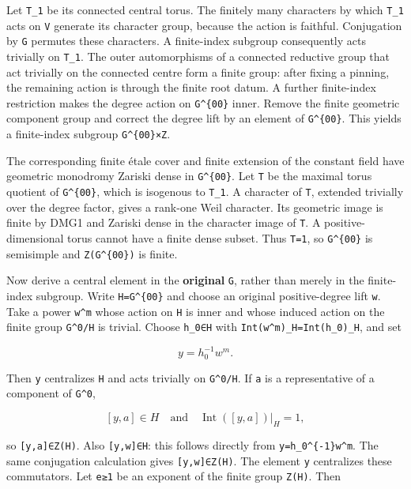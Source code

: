 \documentclass[
]{report}
\begin{document}
Let \texttt{T\_1} be its connected central torus. The finitely many
characters by which \texttt{T\_1} acts on \texttt{V} generate its
character group, because the action is faithful. Conjugation by
\texttt{G} permutes these characters. A finite-index subgroup
consequently acts trivially on \texttt{T\_1}. The outer automorphisms of
a connected reductive group that act trivially on the connected centre
form a finite group: after fixing a pinning, the remaining action is
through the finite root datum. A further finite-index restriction makes
the degree action on \texttt{G\^{}\{00\}} inner. Remove the finite
geometric component group and correct the degree lift by an element of
\texttt{G\^{}\{00\}}. This yields a finite-index subgroup
\texttt{G\^{}\{00\}×Z}.

The corresponding finite étale cover and finite extension of the
constant field have geometric monodromy Zariski dense in
\texttt{G\^{}\{00\}}. Let \texttt{T} be the maximal torus quotient of
\texttt{G\^{}\{00\}}, which is isogenous to \texttt{T\_1}. A character
of \texttt{T}, extended trivially over the degree factor, gives a
rank-one Weil character. Its geometric image is finite by DMG1 and
Zariski dense in the character image of \texttt{T}. A
positive-dimensional torus cannot have a finite dense subset. Thus
\texttt{T=1}, so \texttt{G\^{}\{00\}} is semisimple and
\texttt{Z(G\^{}\{00\})} is finite.

Now derive a central element in the \textbf{original} \texttt{G}, rather
than merely in the finite-index subgroup. Write \texttt{H=G\^{}\{00\}}
and choose an original positive-degree lift \texttt{w}. Take a power
\texttt{w\^{}m} whose action on \texttt{H} is inner and whose induced
action on the finite group \texttt{G\^{}0/H} is trivial. Choose
\texttt{h\_0∈H} with
\texttt{Int(w\^{}m)\textbar{}\_H=Int(h\_0)\textbar{}\_H}, and set

\[
y=h_0^{-1}w^m.
\tag{DMG2.1}
\]

Then \texttt{y} centralizes \texttt{H} and acts trivially on
\texttt{G\^{}0/H}. If \texttt{a} is a representative of a component of
\texttt{G\^{}0},

\[
[y,a]\in H
\quad\text{and}\quad
\operatorname{Int}([y,a])|_H=1,
\]

so \texttt{{[}y,a{]}∈Z(H)}. Also \texttt{{[}y,w{]}∈H}: this follows
directly from \texttt{y=h\_0\^{}\{-1\}w\^{}m}. The same conjugation
calculation gives \texttt{{[}y,w{]}∈Z(H)}. The element \texttt{y}
centralizes these commutators. Let \texttt{e≥1} be an exponent of the
finite group \texttt{Z(H)}. Then
\end{document}
